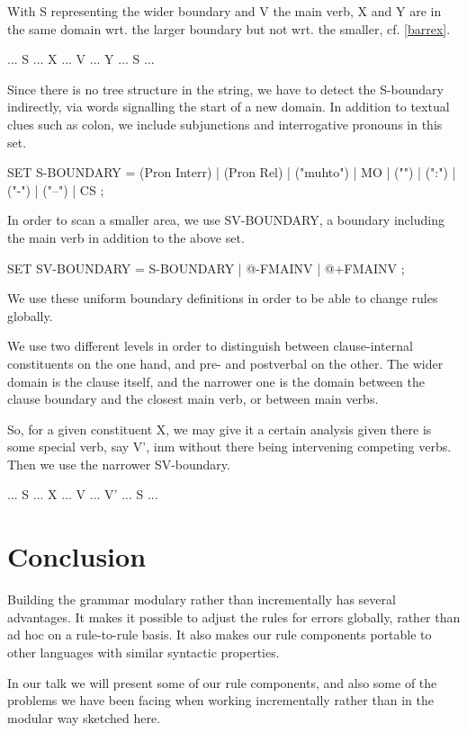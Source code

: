 \documentclass[a4paper,english]{article}
\begin{document}
With S representing the wider boundary and V the main verb, X and Y are in the same domain wrt. the larger boundary but not wrt. the smaller, cf. \ref{barrex}.

\begin{example}\label{barrex}
... S ... X ... V ... Y ... S ... 
\end{example}

Since there is no tree structure in the string, we have to detect the S-boundary indirectly, via words signalling the start of a new domain. In addition to textual clues such as colon, we include subjunctions and interrogative pronouns in this set.

\begin{example}\label{s}
SET S-BOUNDARY  = (Pron Interr) | (Pron Rel) | ("muhto") | MO | ("\;") | (":") | ("-") | ("–") | CS ;
	
\end{example}

In order to scan a smaller area, we use SV-BOUNDARY, a boundary including the main verb in addition to the above set.

\begin{example}\label{sv}
SET SV-BOUNDARY = S-BOUNDARY | @-FMAINV | @+FMAINV ;
\end{example}

We use these uniform boundary definitions in order to be able to change rules globally. 

We use two different levels in order to distinguish between clause-internal constituents on the one hand, and pre- and postverbal on the other. The wider domain is the clause itself, and the narrower one is the domain between the clause boundary and the closest main verb, or between main verbs.

So, for a given constituent X, we may give it a certain analysis given there is some special verb, say V', inm without there being intervening competing verbs. Then we use the narrower SV-boundary.

\begin{example}\label{svx}
... S ... X ... V ... V' ... S ...
\end{example}



\section{Conclusion}

Building the grammar modulary rather than incrementally has several advantages. It makes it possible to adjust the rules for errors globally, rather than ad hoc on a rule-to-rule basis. It also makes our rule components portable to other languages with similar syntactic properties.

In our talk we will present some of our rule components, and also some of the problems we have been facing when working incrementally rather than in the modular way sketched here.

       

%
%
\end{document}

